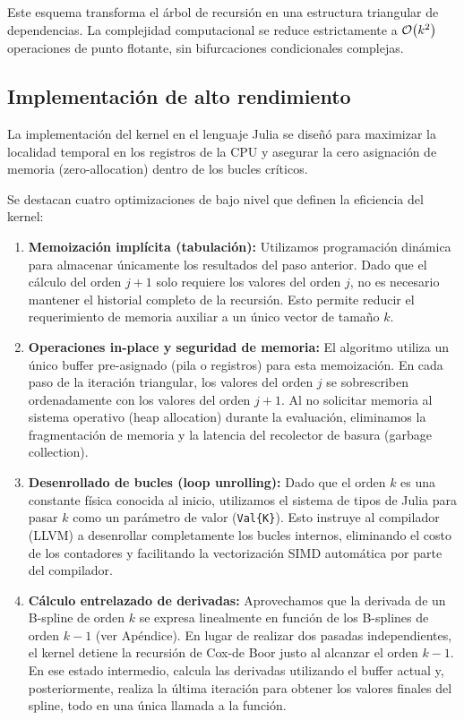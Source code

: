 \documentclass[12pt, a4paper, oneside, spanish]{article}
\begin{document}
Este esquema transforma el árbol de recursión en una estructura triangular de dependencias. La complejidad computacional se reduce estrictamente a \( \order{k^2} \) operaciones de punto flotante, sin bifurcaciones condicionales complejas.

\subsection{Implementación de alto rendimiento}

La implementación del kernel en el lenguaje Julia se diseñó para maximizar la localidad temporal en los registros de la CPU y asegurar la cero asignación de memoria (zero-allocation) dentro de los bucles críticos.

Se destacan cuatro optimizaciones de bajo nivel que definen la eficiencia del kernel:

\begin{enumerate}[label=\textbf{\Alph*.}, leftmargin=*]
    \item \textbf{Memoización implícita (tabulación):} Utilizamos programación dinámica para almacenar únicamente los resultados del paso anterior. Dado que el cálculo del orden \( j+1 \) solo requiere los valores del orden \( j \), no es necesario mantener el historial completo de la recursión. Esto permite reducir el requerimiento de memoria auxiliar a un único vector de tamaño \( k \).
    
    \item \textbf{Operaciones in-place y seguridad de memoria:} El algoritmo utiliza un único buffer pre-asignado (pila o registros) para esta memoización. En cada paso de la iteración triangular, los valores del orden \( j \) se sobrescriben ordenadamente con los valores del orden \( j+1 \). Al no solicitar memoria al sistema operativo (heap allocation) durante la evaluación, eliminamos la fragmentación de memoria y la latencia del recolector de basura (garbage collection).

    \item \textbf{Desenrollado de bucles (loop unrolling):} Dado que el orden \( k \) es una constante física conocida al inicio, utilizamos el sistema de tipos de Julia para pasar \( k \) como un parámetro de valor (\texttt{Val\{K\}}). Esto instruye al compilador (LLVM) a desenrollar completamente los bucles internos, eliminando el costo de los contadores y facilitando la vectorización SIMD automática por parte del compilador.

    \item \textbf{Cálculo entrelazado de derivadas:} Aprovechamos que la derivada de un B-spline de orden \( k \) se expresa linealmente en función de los B-splines de orden \( k-1 \) (ver Apéndice). En lugar de realizar dos pasadas independientes, el kernel detiene la recursión de Cox-de Boor justo al alcanzar el orden \( k-1 \). En ese estado intermedio, calcula las derivadas utilizando el buffer actual y, posteriormente, realiza la última iteración para obtener los valores finales del spline, todo en una única llamada a la función.
\end{enumerate}
\end{document}
